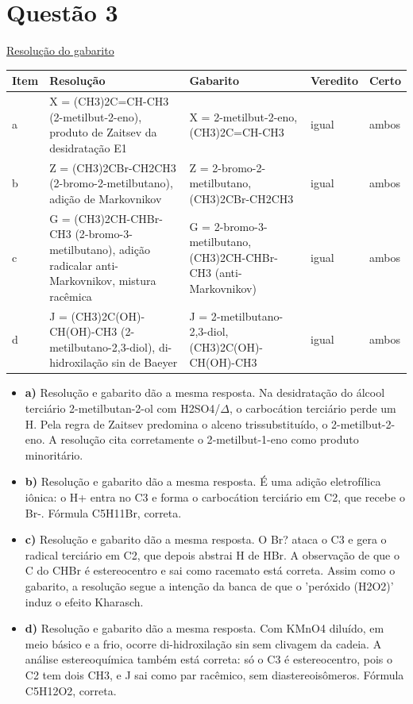 \documentclass{article}%
\begin{document}
\section*{Questão 3}%
\href{https://poliedroresolve.sistemapoliedro.com.br/vestibulares/ita/2027/ita-2-fase-dia-2-21-10-2026-2-fase-dia-2/dissertativa-3-quimica-2-fase-dia-2-ita-2027}{Resolução do gabarito}\par\smallskip%
\begin{longtable}{@{}p{} p{} p{} p{} p{}@{}}\toprule Item & Resolução & Gabarito & Veredito & Certo \\ \midrule
a & X = (CH3)2C=CH-CH3 (2{-}metilbut{-}2{-}eno), produto de Zaitsev da desidratação E1 & X = 2{-}metilbut{-}2{-}eno, (CH3)2C=CH-CH3 & igual & ambos \\
b & Z = (CH3)2CBr-CH2CH3 (2{-}bromo{-}2{-}metilbutano), adição de Markovnikov & Z = 2{-}bromo{-}2{-}metilbutano, (CH3)2CBr-CH2CH3 & igual & ambos \\
c & G = (CH3)2CH-CHBr-CH3 (2{-}bromo{-}3{-}metilbutano), adição radicalar anti{-}Markovnikov, mistura racêmica & G = 2{-}bromo{-}3{-}metilbutano, (CH3)2CH-CHBr-CH3 (anti{-}Markovnikov) & igual & ambos \\
d & J = (CH3)2C(OH)-CH(OH)-CH3 (2{-}metilbutano{-}2,3{-}diol), di{-}hidroxilação sin de Baeyer & J = 2{-}metilbutano{-}2,3{-}diol, (CH3)2C(OH)-CH(OH)-CH3 & igual & ambos \\
\bottomrule\end{longtable}%
\begin{itemize}%
\item%
\textbf{a)} Resolução e gabarito dão a mesma resposta. Na desidratação do álcool terciário 2{-}metilbutan{-}2{-}ol com H2SO4/$\Delta$, o carbocátion terciário perde um H. Pela regra de Zaitsev predomina o alceno trissubstituído, o 2{-}metilbut{-}2{-}eno. A resolução cita corretamente o 2{-}metilbut{-}1{-}eno como produto minoritário.%
\item%
\textbf{b)} Resolução e gabarito dão a mesma resposta. É uma adição eletrofílica iônica: o H+ entra no C3 e forma o carbocátion terciário em C2, que recebe o Br-. Fórmula C5H11Br, correta.%
\item%
\textbf{c)} Resolução e gabarito dão a mesma resposta. O Br? ataca o C3 e gera o radical terciário em C2, que depois abstrai H de HBr. A observação de que o C do CHBr é estereocentro e sai como racemato está correta. Assim como o gabarito, a resolução segue a intenção da banca de que o 'peróxido (H2O2)' induz o efeito Kharasch.%
\item%
\textbf{d)} Resolução e gabarito dão a mesma resposta. Com KMnO4 diluído, em meio básico e a frio, ocorre di{-}hidroxilação sin sem clivagem da cadeia. A análise estereoquímica também está correta: só o C3 é estereocentro, pois o C2 tem dois CH3, e J sai como par racêmico, sem diastereoisômeros. Fórmula C5H12O2, correta.%
\end{itemize}%
\end{document}
